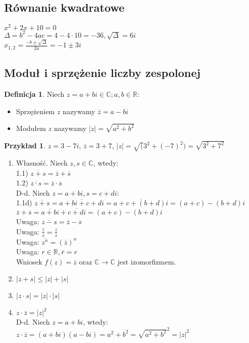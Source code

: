 \documentclass{article}
\theoremstyle{definition}
\newtheorem{de}{Definicja}[subsection]
\theoremstyle{definition}
\theoremstyle{definition}
\newtheorem{pk}{Przykład}[subsection]
\theoremstyle{definition}
\begin{document}
\subsection{Równanie kwadratowe}
$x^2+2x+10=0$\\
$\Delta=b^2-4ac=4-4\cdot 10 = -36, \sqrt{\Delta}=6i$\\
$x_{1,2}=\frac{-b \pm \sqrt{\Delta}}{2a}=-1\pm3i$

\subsection{Moduł i sprzężenie liczby zespolonej}

\begin{de}
    Niech $z=a+bi \in \mathbb{C}; a,b \in \mathbb{R}$:
    \begin{itemize}
        \item Sprzężeniem $z$ nazywamy $\overline{z}=a-bi$
        \item Modułem $z$ nazywamy $|z|=\sqrt{a^2+b^2}$
    \end{itemize}
\end{de}

\begin{pk}
    $z=3-7i$, $\overline{z}=3+7$, $|z|=\sqrt(3^2+(-7)^2)=\sqrt{3^2+7^2}$
\end{pk}

\begin{enumerate}
    \item Własność. Niech $z,s\in\mathbb{C}$, wtedy:\\
    1.1) $\overline{z+s}=\overline{z}+\overline{s}$\\
    1.2) $\overline{z\cdot s}=\overline{z}\cdot \overline{s}$\\
    D-d. Niech $z=a+bi, s=c+di$:\\
    1.1d) $\overline{z+s}=\overline{a+bi+c+di}=\overline{a+c+(b+d)i}=(a+c)-(b+d)i$\\
    $\overline{z}+\overline{s} = \overline{a+bi}+\overline{c+di}=(a+c)-(b+d)i$\\
    Uwaga: $\overline{z-s}=\overline{z}-\overline{s}$\\
    Uwaga: $\overline{\frac{z}{s}}=\frac{\overline{z}}{\overline{s}}$\\
    Uwaga: $\overline{z^n}=(\overline{z})^n$\\
    Uwaga: $r\in\mathbb{R}, \overline{r}=r$\\
    Wniosek $f(z)=\overline{z}$ oraz $\mathbb{C}\rightarrow\mathbb{C}$ jest izomorfizmem.
    \item $|z+s|\leq|z|+|s|$
    \item $|z\cdot s|=|z|\cdot|s|$
    \item $z\cdot \overline{z} = |z|^2$\\
    D-d. Niech $z=a+bi$, wtedy:\\
    $z\cdot \overline{z}=(a+bi)(a-bi)=a^2+b^2=\sqrt{a^2+b^2}^2=|z|^2$
\end{enumerate}
\end{document}

